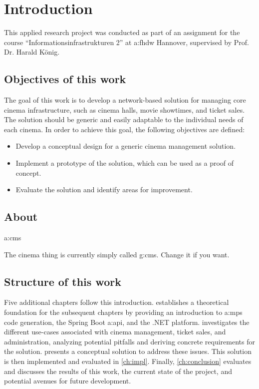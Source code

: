 \chapter{Introduction}
\label{ch:intro}

This applied research project was conducted as part of an assignment for the course \enquote{Informationsinfrastrukturen 2} at \gls{a:fhdw} Hannover, supervised by Prof. Dr. Harald König.

\section{Objectives of this work}


The goal of this work is to develop a network-based solution for managing core cinema infrastructure, such as cinema halls, movie showtimes, and ticket sales. The solution should be generic and easily adaptable to the individual needs of each cinema. In order to achieve this goal, the following objectives are defined:

\begin{itemize}
    \item Develop a conceptual design for a generic cinema management solution.
    \item Implement a prototype of the solution, which can be used as a proof of concept.
    \item Evaluate the solution and identify areas for improvement.
\end{itemize}

\section{About }

\gls{a:cms}


The cinema thing is currently simply called \gls{g:cms}. Change it if you want.

\section{Structure of this work}

Five additional chapters follow this introduction.  establishes a theoretical foundation for the subsequent chapters by providing an introduction to \gls{a:mps} code generation, the Spring Boot \gls{a:api}, and the .NET platform.  investigates the different use-cases associated with cinema management, ticket sales, and administration, analyzing potential pitfalls and deriving concrete requirements for the solution.  presents a conceptual solution to address these issues. This solution is then implemented and evaluated in \cref{ch:impl}. Finally, \cref{ch:conclusion} evaluates and discusses the results of this work, the current state of the project, and potential avenues for future development.